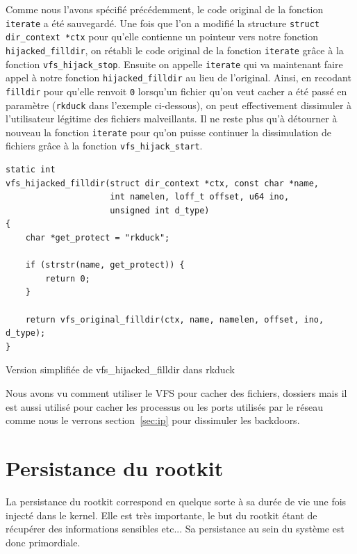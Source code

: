 \documentclass[11pt]{article}
\begin{document}
        Comme nous l'avons spécifié précédemment, le code original de la fonction \texttt{iterate} a été sauvegardé. Une fois que l'on a modifié la structure \texttt{struct dir\_context *ctx} pour qu'elle contienne un pointeur vers notre fonction \texttt{hijacked\_filldir}, on rétabli le code original de la fonction \texttt{iterate} grâce à la fonction \texttt{vfs\_hijack\_stop}. Ensuite on appelle \texttt{iterate} qui va maintenant faire appel à notre fonction \texttt{hijacked\_filldir} au lieu de l'original. Ainsi, en recodant \texttt{filldir} pour qu'elle renvoit \texttt{0} lorsqu'un fichier qu'on veut cacher a été passé en paramètre (\texttt{rkduck} dans l'exemple ci-dessous), on peut effectivement dissimuler à l'utilisateur légitime des fichiers malveillants. Il ne reste plus qu'à détourner à nouveau la fonction \texttt{iterate} pour qu'on puisse continuer la dissimulation de fichiers grâce à la fonction \texttt{vfs\_hijack\_start}.\\

\begin{listing}[H]
\begin{verbatim}
static int 
vfs_hijacked_filldir(struct dir_context *ctx, const char *name, 
                     int namelen, loff_t offset, u64 ino, 
                     unsigned int d_type) 
{
    char *get_protect = "rkduck";
    
    if (strstr(name, get_protect)) {
        return 0;
    }

    return vfs_original_filldir(ctx, name, namelen, offset, ino, d_type);
}
\end{verbatim}
\caption{Version simplifiée de vfs\_hijacked\_filldir dans rkduck}
\label{listing:3}
\end{listing}

Nous avons vu comment utiliser le VFS pour cacher des fichiers, dossiers mais il est aussi utilisé pour cacher les processus ou les ports utilisés par le réseau comme nous le verrons section~\ref{sec:ip} pour dissimuler les backdoors.

\section{Persistance du rootkit}
    
    La persistance du rootkit correspond en quelque sorte à sa durée de vie une fois injecté dans le kernel. Elle est très importante, le but du rootkit étant de récupérer des informations sensibles etc... Sa persistance au sein du système est donc primordiale. \\
    
\end{document}
